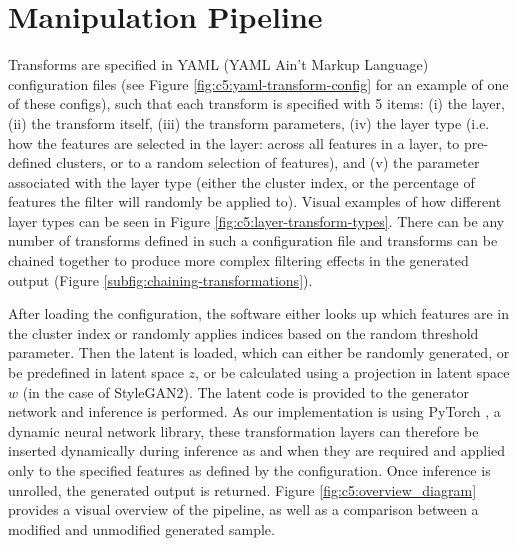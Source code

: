 \section{Manipulation Pipeline}

Transforms are specified in YAML (YAML Ain't Markup Language) configuration files \citep{ben2009yaml} (see Figure \ref{fig:c5:yaml-transform-config} for an example of one of these configs), such that each transform is specified with 5 items: (i) the layer, (ii) the transform itself, (iii) the transform parameters, (iv) the layer type (i.e. how the features are selected in the layer: across all features in a layer, to pre-defined clusters, or to a random selection of features), and (v) the parameter associated with the layer type (either the cluster index, or the percentage of features the filter will randomly be applied to). 
Visual examples of how different layer types can be seen in Figure \ref{fig:c5:layer-transform-types}.
There can be any number of transforms defined in such a configuration file and transforms can be chained together to produce more complex filtering effects in the generated output (Figure \ref{subfig:chaining-transformations}).

After loading the configuration, the software either looks up which features are in the cluster index or randomly applies indices based on the random threshold parameter. 
Then the latent is loaded, which can either be randomly generated, or be predefined in latent space $z$, or be calculated using a projection in latent space $w$ \citep{abdal2019image2stylegan,karras2019analyzing} (in the case of StyleGAN2). The latent code is provided to the generator network and inference is performed. 
As our implementation is using PyTorch \citep{paszke2019pytorch}, a dynamic neural network library, these transformation layers can therefore be inserted dynamically during inference as and when they are required and applied only to the specified features as defined by the configuration. 
Once inference is unrolled, the generated output is returned. Figure \ref{fig:c5:overview_diagram} provides a visual overview of the pipeline, as well as a comparison between a modified and unmodified generated sample.

